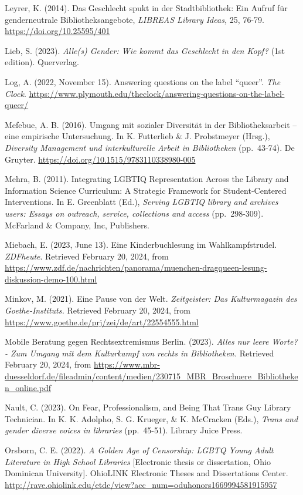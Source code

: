 \documentclass[a4paper,
fontsize=11pt,
oneside,
numbers=noperiodatend,
parskip=half-,
bibliography=totoc,
final
]{scrartcl}
\begin{document}
Leyrer, K. (2014). Das Geschlecht spukt in der Stadtbibliothek: Ein
Aufruf für genderneutrale Bibliotheksangebote, \emph{LIBREAS Library
Ideas,} 25, 76-79. \url{https://doi.org/10.25595/401}

Lieb, S. (2023). \emph{Alle(s) Gender: Wie kommt das Geschlecht in den
Kopf?} (1st edition). Querverlag.

Log, A. (2022, November 15). Answering questions on the label \enquote{queer}.
\emph{The Clock}.
\url{https://www.plymouth.edu/theclock/answering-questions-on-the-label-queer/}

Mefebue, A. B. (2016). Umgang mit sozialer Diversität in der
Bibliotheksarbeit -- eine empirische Untersuchung. In K. Futterlieb \&
J. Probstmeyer (Hrsg.), \emph{Diversity Management und interkulturelle
Arbeit in Bibliotheken} (pp.~43-74). De Gruyter.
\url{https://doi.org/10.1515/9783110338980-005}

Mehra, B. (2011). Integrating LGBTIQ Representation Across the Library
and Information Science Curriculum: A Strategic Framework for
Student-Centered Interventions. In E. Greenblatt (Ed.), \emph{Serving
LGBTIQ library and archives users: Essays on outreach, service,
collections and access} (pp.~298-309). McFarland \& Company, Inc,
Publishers.

Miebach, E. (2023, June 13). Eine Kinderbuchlesung im Wahlkampfstrudel.
\emph{ZDFheute}. Retrieved February 20, 2024, from
\url{https://www.zdf.de/nachrichten/panorama/muenchen-dragqueen-lesung-diskussion-demo-100.html}

Minkov, M. (2021). Eine Pause von der Welt. \emph{Zeitgeister: Das
Kulturmagazin des Goethe-Instituts.} Retrieved February 20, 2024, from
\url{https://www.goethe.de/prj/zei/de/art/22554555.html}

Mobile Beratung gegen Rechtsextremismus Berlin. (2023). \emph{Alles nur
leere Worte? - Zum Umgang mit dem Kulturkampf von rechts in
Bibliotheken.} Retrieved February 20, 2024, from
\url{https://www.mbr-duesseldorf.de/fileadmin/content/medien/230715_MBR_Broschuere_Bibliotheken_online.pdf}

Nault, C. (2023). On Fear, Professionalism, and Being That Trans Guy
Library Technician. In K. K. Adolpho, S. G. Krueger, \& K. McCracken
(Eds.), \emph{Trans and gender diverse voices in libraries} (pp.~45-51).
Library Juice Press.

Orsborn, C. E. (2022). \emph{A Golden Age of Censorship: LGBTQ Young
Adult Literature in High School Libraries} {[}Electronic thesis or
dissertation, Ohio Dominican University{]}. OhioLINK Electronic Theses
and Dissertations Center.
\url{http://rave.ohiolink.edu/etdc/view?acc_num=oduhonors1669994581915957}
\end{document}
